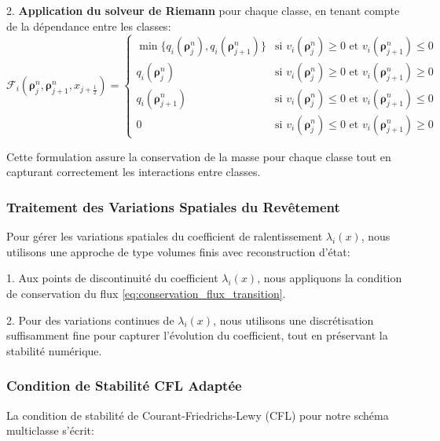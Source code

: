 2. \textbf{Application du solveur de Riemann} pour chaque classe, en tenant compte de la dépendance entre les classes:
\begin{equation}
\mathcal{F}_i\left(\boldsymbol{\rho}^n_j, \boldsymbol{\rho}^n_{j+1}, x_{j+\frac{1}{2}}\right) = 
\begin{cases}
\min\{q_i(\boldsymbol{\rho}^n_j), q_i(\boldsymbol{\rho}^n_{j+1})\} & \text{si } v_i(\boldsymbol{\rho}^n_j) \geq 0 \text{ et } v_i(\boldsymbol{\rho}^n_{j+1}) \leq 0 \\
q_i(\boldsymbol{\rho}^n_j) & \text{si } v_i(\boldsymbol{\rho}^n_j) \geq 0 \text{ et } v_i(\boldsymbol{\rho}^n_{j+1}) \geq 0 \\
q_i(\boldsymbol{\rho}^n_{j+1}) & \text{si } v_i(\boldsymbol{\rho}^n_j) \leq 0 \text{ et } v_i(\boldsymbol{\rho}^n_{j+1}) \leq 0 \\
0 & \text{si } v_i(\boldsymbol{\rho}^n_j) \leq 0 \text{ et } v_i(\boldsymbol{\rho}^n_{j+1}) \geq 0
\end{cases}
\end{equation}

Cette formulation assure la conservation de la masse pour chaque classe tout en capturant correctement les interactions entre classes.

\subsubsection{Traitement des Variations Spatiales du Revêtement}
\label{subsubsec:traitement_revetement}

Pour gérer les variations spatiales du coefficient de ralentissement $\lambda_i(x)$, nous utilisons une approche de type volumes finis avec reconstruction d'état:

1. Aux points de discontinuité du coefficient $\lambda_i(x)$, nous appliquons la condition de conservation du flux \eqref{eq:conservation_flux_transition}.

2. Pour des variations continues de $\lambda_i(x)$, nous utilisons une discrétisation suffisamment fine pour capturer l'évolution du coefficient, tout en préservant la stabilité numérique.

\subsubsection{Condition de Stabilité CFL Adaptée}
\label{subsubsec:condition_cfl}

La condition de stabilité de Courant-Friedrichs-Lewy (CFL) pour notre schéma multiclasse s'écrit:


